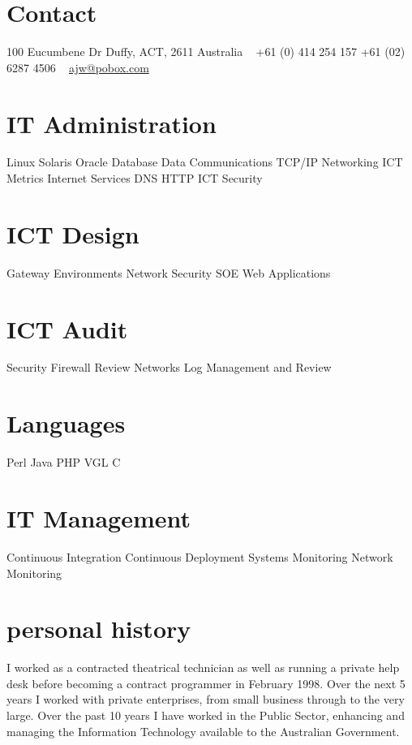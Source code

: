 \documentclass[]{friggeri-cv} %
\begin{document}


\begin{aside} %
\section{Contact}
100 Eucumbene Dr
Duffy, ACT, 2611
Australia
~
+61 (0) 414 254 157
+61 (02) 6287 4506
~
\href{mailto:ajw@pobox.com}{ajw@pobox.com}
\section{IT Administration}
Linux
Solaris
Oracle Database
Data Communications
TCP/IP Networking
ICT Metrics
Internet Services
DNS
HTTP
ICT Security
\section{ICT Design}
Gateway Environments
Network
Security
SOE
Web Applications
\section{ICT Audit}
Security
Firewall Review
Networks
Log Management and Review
\section{Languages}
Perl
Java
PHP
VGL
C
\section{IT Management}
Continuous Integration
Continuous Deployment
Systems Monitoring
Network Monitoring
\end{aside}

\section{personal history}
I worked as a contracted theatrical technician as well as running a private help desk before becoming a contract programmer in February 1998. Over the next 5 years I worked with private enterprises, from small business through to the very large. Over the past 10 years I have worked in the Public Sector, enhancing and managing the Information Technology available to the Australian Government.
\end{document}
